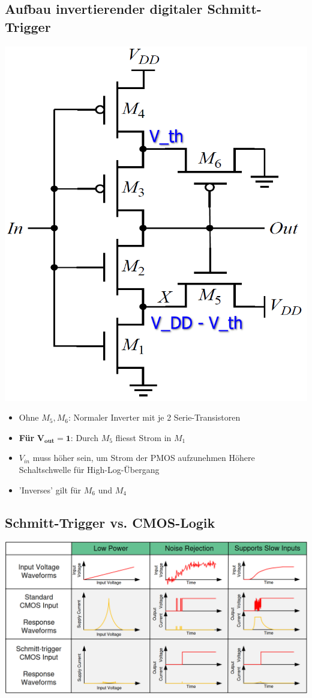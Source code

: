 \subsection{Aufbau invertierender digitaler Schmitt-Trigger}

\begin{minipage}[position]{0.3\columnwidth}
    \includegraphics[width=\columnwidth]{images/invertierender_schmitt-trigger.png}
\end{minipage}
\hfill
\begin{minipage}[position]{0.68\columnwidth}
    \begin{itemize}
        \item Ohne $M_5, M_6$: Normaler Inverter mit je 2 Serie-Transistoren
        \item \textbf{Für }$\boldsymbol{V_{out} = 1}$: Durch $M_5$ fliesst Strom in $M_1$
        \item $V_{in}$ muss höher sein, um Strom der PMOS aufzunehmen \textrightarrow Höhere Schaltschwelle für High-Log-Übergang
        \item 'Inverses' gilt für $M_6$ und $M_4$
    \end{itemize}
\end{minipage}


\subsection{Schmitt-Trigger vs. CMOS-Logik}

\includegraphics[width=\columnwidth]{images/benefits_schmitt-trigger.png}